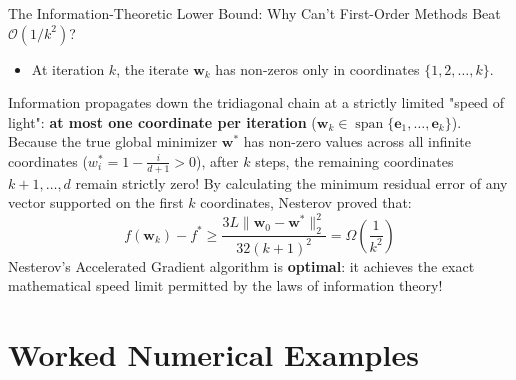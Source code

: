 \begin{ponderbox}{The Information-Theoretic Lower Bound: Why Can't First-Order Methods Beat $\mathcal{O}(1/k^2)$?}
\begin{itemize}
    \item At iteration $k$, the iterate $\mathbf{w}_k$ has non-zeros only in coordinates $\{1, 2, \dots, k\}$.
\end{itemize}
Information propagates down the tridiagonal chain at a strictly limited "speed of light": \textbf{at most one coordinate per iteration} ($\mathbf{w}_k \in \operatorname{span}\{\mathbf{e}_1, \dots, \mathbf{e}_k\}$).
Because the true global minimizer $\mathbf{w}^*$ has non-zero values across all infinite coordinates ($w_i^* = 1 - \frac{i}{d+1} > 0$), after $k$ steps, the remaining coordinates $k+1, \dots, d$ remain strictly zero!
By calculating the minimum residual error of any vector supported on the first $k$ coordinates, Nesterov proved that:
\begin{equation*}
f(\mathbf{w}_k) - f^* \ge \frac{3L \|\mathbf{w}_0 - \mathbf{w}^*\|_2^2}{32 (k + 1)^2} = \Omega\left(\frac{1}{k^2}\right)
\end{equation*}
Nesterov's Accelerated Gradient algorithm is \textbf{optimal}: it achieves the exact mathematical speed limit permitted by the laws of information theory!
\end{ponderbox}

\section{Worked Numerical Examples}

